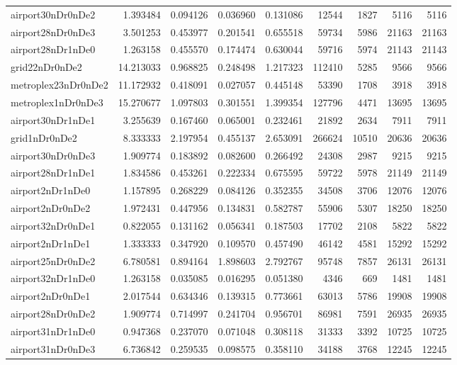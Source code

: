 \begin{longtable}{|l|r|r|r|r|r|r|r|r|}
airport30nDr0nDe2 & 1.393484 & 0.094126 & 0.036960 & 0.131086 & 12544 & 1827 & 5116 & 5116 \\
airport28nDr0nDe3 & 3.501253 & 0.453977 & 0.201541 & 0.655518 & 59734 & 5986 & 21163 & 21163 \\
airport28nDr1nDe0 & 1.263158 & 0.455570 & 0.174474 & 0.630044 & 59716 & 5974 & 21143 & 21143 \\
grid22nDr0nDe2 & 14.213033 & 0.968825 & 0.248498 & 1.217323 & 112410 & 5285 & 9566 & 9566 \\
metroplex23nDr0nDe2 & 11.172932 & 0.418091 & 0.027057 & 0.445148 & 53390 & 1708 & 3918 & 3918 \\
metroplex1nDr0nDe3 & 15.270677 & 1.097803 & 0.301551 & 1.399354 & 127796 & 4471 & 13695 & 13695 \\
airport30nDr1nDe1 & 3.255639 & 0.167460 & 0.065001 & 0.232461 & 21892 & 2634 & 7911 & 7911 \\
grid1nDr0nDe2 & 8.333333 & 2.197954 & 0.455137 & 2.653091 & 266624 & 10510 & 20636 & 20636 \\
airport30nDr0nDe3 & 1.909774 & 0.183892 & 0.082600 & 0.266492 & 24308 & 2987 & 9215 & 9215 \\
airport28nDr1nDe1 & 1.834586 & 0.453261 & 0.222334 & 0.675595 & 59722 & 5978 & 21149 & 21149 \\
airport2nDr1nDe0 & 1.157895 & 0.268229 & 0.084126 & 0.352355 & 34508 & 3706 & 12076 & 12076 \\
airport2nDr0nDe2 & 1.972431 & 0.447956 & 0.134831 & 0.582787 & 55906 & 5307 & 18250 & 18250 \\
airport32nDr0nDe1 & 0.822055 & 0.131162 & 0.056341 & 0.187503 & 17702 & 2108 & 5822 & 5822 \\
airport2nDr1nDe1 & 1.333333 & 0.347920 & 0.109570 & 0.457490 & 46142 & 4581 & 15292 & 15292 \\
airport25nDr0nDe2 & 6.780581 & 0.894164 & 1.898603 & 2.792767 & 95748 & 7857 & 26131 & 26131 \\
airport32nDr1nDe0 & 1.263158 & 0.035085 & 0.016295 & 0.051380 & 4346 & 669 & 1481 & 1481 \\
airport2nDr0nDe1 & 2.017544 & 0.634346 & 0.139315 & 0.773661 & 63013 & 5786 & 19908 & 19908 \\
airport28nDr0nDe2 & 1.909774 & 0.714997 & 0.241704 & 0.956701 & 86981 & 7591 & 26935 & 26935 \\
airport31nDr1nDe0 & 0.947368 & 0.237070 & 0.071048 & 0.308118 & 31333 & 3392 & 10725 & 10725 \\
airport31nDr0nDe3 & 6.736842 & 0.259535 & 0.098575 & 0.358110 & 34188 & 3768 & 12245 & 12245 \\

\end{longtable}
